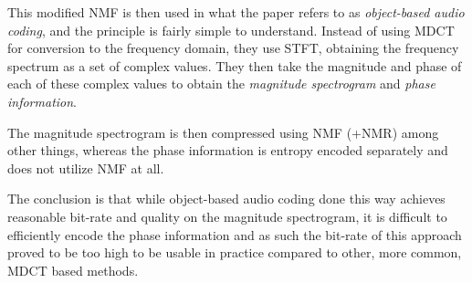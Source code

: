 This modified NMF is then used in what the paper refers to as \emph{object-based audio coding}, and the principle is fairly simple to understand. Instead of using MDCT for conversion to the frequency domain, they use STFT, obtaining the frequency spectrum as a set of complex values. They then take the magnitude and phase of each of these complex values to obtain the \emph{magnitude spectrogram} and \emph{phase information}.

The magnitude spectrogram is then compressed using NMF (+NMR) among other things, whereas the phase information is entropy encoded separately and does not utilize NMF at all.

The conclusion is that while object-based audio coding done this way achieves reasonable bit-rate and quality on the magnitude spectrogram, it is difficult to efficiently encode the phase information and as such the bit-rate of this approach proved to be too high to be usable in practice compared to other, more common, MDCT based methods.


